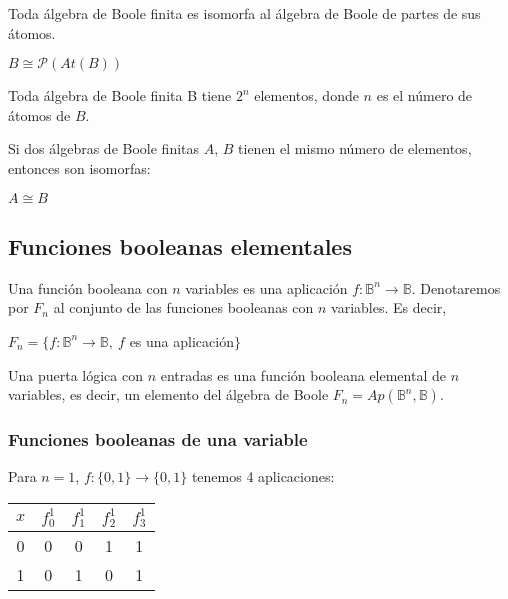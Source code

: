 \begin{ncor}
    Toda álgebra de Boole finita es isomorfa al álgebra de Boole de partes de sus átomos.
    \begin{center} $B \cong \mathcal{P} (At(B))$ \end{center}
\end{ncor}

\begin{ncor}
    Toda  álgebra de Boole finita B tiene $2^n$ elementos, donde $n$ es el número de átomos de $B$.
\end{ncor}

\begin{nth}
    Si dos álgebras de Boole finitas $A$, $B$ tienen el mismo número de elementos, entonces son isomorfas:
    \begin{center}
        $A \cong B$
    \end{center}
\end{nth}


\subsection{Funciones booleanas elementales}
\begin{ndef}
    Una función booleana con $n$ variables es una aplicación $f: \mathbb{B}^n \rightarrow \mathbb{B}$.
    Denotaremos por $F_n$ al conjunto de las funciones booleanas con $n$ variables. Es decir,
    \begin{center}
        $F_n = \{f:\mathbb{B}^n \rightarrow \mathbb{B}, \ f$ es una aplicación$\}$
    \end{center}
\end{ndef}
\begin{ndef}
    Una puerta lógica con $n$ entradas es una función booleana elemental de $n$ variables, es decir, un elemento del álgebra de Boole
    $F_n = Ap(\mathbb{B}^n, \mathbb{B})$.
\end{ndef}

\subsubsection{Funciones booleanas de una variable}
Para $n=1$, $f: \{0,1\} \rightarrow \{0,1\}$ tenemos 4 aplicaciones:
\begin{center}
    \begin{tabular}{ |c||c|c|c|c|  }
        \hline
        $x$ & $f_0^1$ & $f_1^1$ & $f_2^1$ & $f_3^1$ \\
        \hline
        0   & 0       & 0       & 1       & 1       \\
        1   & 0       & 1       & 0       & 1       \\
        \hline
    \end{tabular}
\end{center}

